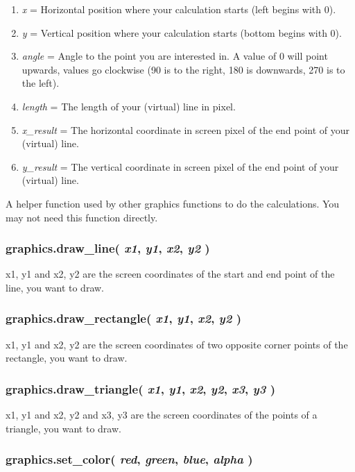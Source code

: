 \documentclass[11pt,parskip=half,a4paper]{scrartcl}
\begin{document}
\begin{enumerate}
	\item \emph{x} = Horizontal position where your calculation starts (left begins with 0).
	\item \emph{y} = Vertical position where your calculation starts (bottom begins with 0).
	\item \emph{angle} = Angle to the point you are interested in. A value of 0 will point upwards, values go clockwise (90 is to the right, 180 is downwards, 270 is to the left).
	\item \emph{length} = The length of your (virtual) line in pixel.
	\item \emph{x\_result} = The horizontal coordinate in screen pixel of the end point of your (virtual) line.
	\item \emph{y\_result} = The vertical coordinate in screen pixel of the end point of your (virtual) line.
\end{enumerate}

A helper function used by other graphics functions to do the calculations. You may not need this function directly.

\subsubsection{graphics.draw\_line( \emph{x1}, \emph{y1}, \emph{x2}, \emph{y2} )}

x1, y1 and x2, y2 are the screen coordinates of the start and end point of the line, you want to draw.

\subsubsection{graphics.draw\_rectangle( \emph{x1}, \emph{y1}, \emph{x2}, \emph{y2} )}

x1, y1 and x2, y2 are the screen coordinates of two opposite corner points of the rectangle, you want to draw.

\subsubsection{graphics.draw\_triangle( \emph{x1}, \emph{y1}, \emph{x2}, \emph{y2}, \emph{x3}, \emph{y3} )}

x1, y1 and x2, y2 and x3, y3 are the screen coordinates of the points of a triangle, you want to draw.

\subsubsection{graphics.set\_color( \emph{red}, \emph{green}, \emph{blue}, \emph{alpha} )}
\end{document}
